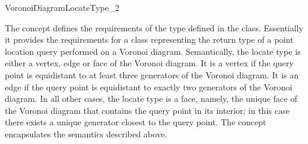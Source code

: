 


\begin{ccRefConcept}{VoronoiDiagramLocateType_2}

\ccDefinition

The concept  defines the requirements of the
 type defined in the 
class. Essentially it provides the requirements for a class
representing the return type of a point location query performed on a
Voronoi diagram. Semantically, the locate type is either a vertex, edge or
face of the Voronoi diagram. It is a vertex if the query point is
equidistant to at least three generators of the Voronoi diagram.
It is an edge if the query point is equidistant to exactly two
generators of the Voronoi diagram. In all other cases, the locate type
is a face, namely, the unique face of the Voronoi diagram that
contains the query point in its interior; in this case there exists a
unique generator closest to the query point. The
 concept encapsulates the 
semantics described above.

\ccRefines
{}\\
\\

\ccTypes
{}
\ccThreeToTwo
%
\ccGlue
{}
\ccGlue
{}


\end{ccRefConcept}
